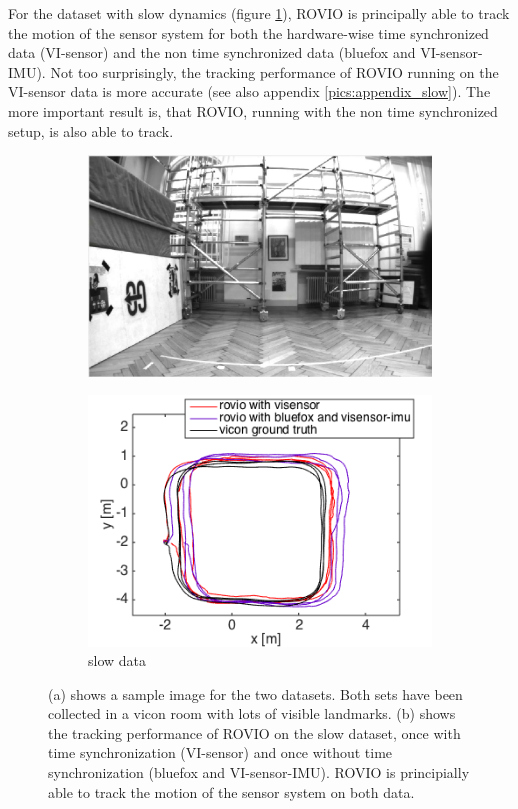 For the dataset with slow dynamics (figure \ref{pics:timesync_slow}), ROVIO is principally able to track the motion of the sensor system for both the hardware-wise time synchronized data (VI-sensor) and the non time synchronized data (bluefox and VI-sensor-IMU). Not too surprisingly, the tracking performance of ROVIO running on the VI-sensor data is more accurate (see also appendix \ref{pics:appendix_slow}). The more important result is, that ROVIO, running with the non time synchronized setup, is also able to track. \\

\begin{figure}
  \begin{subfigure}[b]{0.46\textwidth}
    \captionsetup{skip=6pt}
    \includegraphics[width=\textwidth]{images/slow.png}
    \caption{}
  \end{subfigure}
  \hfill
  \begin{subfigure}[b]{0.42\textwidth}
    \captionsetup{skip=6pt}
    \includegraphics[width=\textwidth]{images/slow_2D.png}
    \caption{slow data}
  \end{subfigure}
   \caption{(a) shows a sample image for the two datasets. Both sets have been collected in a vicon room with lots of visible landmarks. (b) shows the tracking performance of ROVIO on the slow dataset, once with time synchronization (VI-sensor) and once without time synchronization (bluefox and VI-sensor-IMU). ROVIO is principially able to track the motion of the sensor system on both data.}
   \label{pics:timesync_slow}
\end{figure}

